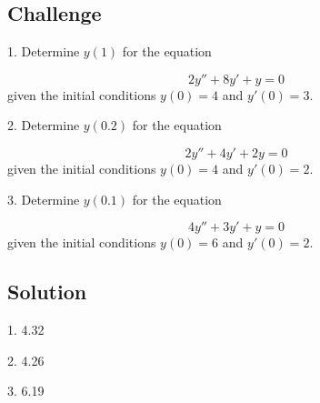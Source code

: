 \subsection*{Challenge}
1. Determine $y(1)$ for the equation

\begin{equation}
    2 y''+8y'+y=0    
\end{equation}
given the initial conditions $y(0)=4$ and $y'(0)=3$.

2. Determine $y(0.2)$ for the equation

\begin{equation}
    2y''+4y'+2y=0
\end{equation}
given the initial conditions $y(0)=4$ and $y'(0)=2$.

3. Determine $y(0.1)$ for the equation

\begin{equation}
    4y''+3y'+y=0
\end{equation}
given the initial conditions $y(0)=6$ and $y'(0)=2$.


\subsection*{Solution}
1. 4.32 %

2. 4.26 %

3. 6.19 %





\fi
